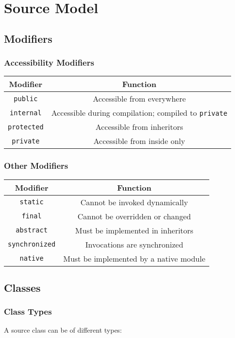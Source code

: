 \documentclass{docs}
\begin{document}
    \tableofcontents
    \pagebreak
    \section{Source Model}
    \subsection{Modifiers}
    \subsubsection{Accessibility Modifiers}
    \begin{center}
    \begin{tabular}{c|c}
        Modifier & Function \\
        \hline
        \texttt{public} & Accessible from everywhere \\
        \texttt{internal} & Accessible during compilation; compiled to \texttt{private} \\
        \texttt{protected} & Accessible from inheritors \\
        \texttt{private} & Accessible from inside only
    \end{tabular}
    \end{center}
    \subsubsection{Other Modifiers}
    \begin{center}
    \begin{tabular}{c|c}
        Modifier & Function \\
        \hline
        \texttt{static} & Cannot be invoked dynamically \\
        \texttt{final} & Cannot be overridden or changed \\
        \texttt{abstract} & Must be implemented in inheritors \\
        \texttt{synchronized} & Invocations are synchronized \\
        \texttt{native} & Must be implemented by a native module
    \end{tabular}
    \end{center}
    \subsection{Classes}
    \subsubsection{Class Types}
    A source class can be of different types:
\end{document}
